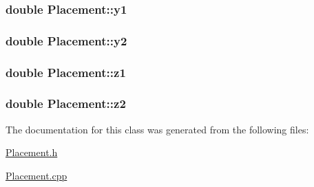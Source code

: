 \subsubsection[{y1}]{\setlength{\rightskip}{0pt plus 5cm}double Placement\+::y1\hspace{0.3cm}{\ttfamily [private]}}\label{classPlacement_a4c17ed499418886700bf8e4d4ee45047}
\hypertarget{classPlacement_ae7b89409ab130ba3d7c268faf7175b40}{}
\subsubsection[{y2}]{\setlength{\rightskip}{0pt plus 5cm}double Placement\+::y2\hspace{0.3cm}{\ttfamily [private]}}\label{classPlacement_ae7b89409ab130ba3d7c268faf7175b40}
\hypertarget{classPlacement_a3e9d90f2d85b6641d2fd7d74d2600394}{}
\subsubsection[{z1}]{\setlength{\rightskip}{0pt plus 5cm}double Placement\+::z1\hspace{0.3cm}{\ttfamily [private]}}\label{classPlacement_a3e9d90f2d85b6641d2fd7d74d2600394}
\hypertarget{classPlacement_aed710205286315a2a14f8cc2ceacd267}{}
\subsubsection[{z2}]{\setlength{\rightskip}{0pt plus 5cm}double Placement\+::z2\hspace{0.3cm}{\ttfamily [private]}}\label{classPlacement_aed710205286315a2a14f8cc2ceacd267}


The documentation for this class was generated from the following files\+:\begin{DoxyCompactItemize}
\item 
\hyperlink{Placement_8h}{Placement.\+h}\item 
\hyperlink{Placement_8cpp}{Placement.\+cpp}\end{DoxyCompactItemize}
